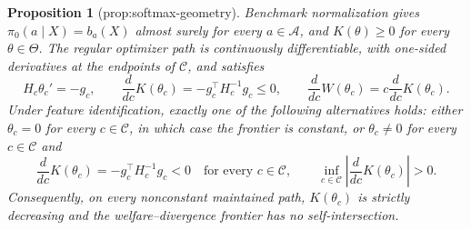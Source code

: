 \documentclass{article}
\newtheorem{proposition}{Proposition}
\begin{document}
\begin{proposition}[prop:softmax-geometry]\label{prop:softmax-geometry}
Benchmark normalization gives \(\pi_0(a\mid X)=b_a(X)\) almost surely for every \(a\in\mathcal A\), and \(K(\theta)\geq 0\) for every \(\theta\in\Theta\). The regular optimizer path is continuously differentiable, with one-sided derivatives at the endpoints of \(\mathcal C\), and satisfies
\[
 H_c\theta_c'=-g_c,\qquad
 \frac{d}{dc}K(\theta_c)=-g_c^\top H_c^{-1}g_c\leq 0,
 \qquad
 \frac{d}{dc}W(\theta_c)=c\frac{d}{dc}K(\theta_c).
\]
Under feature identification, exactly one of the following alternatives holds: either \(\theta_c=0\) for every \(c\in\mathcal C\), in which case the frontier is constant, or \(\theta_c\neq 0\) for every \(c\in\mathcal C\) and
\[
 \frac{d}{dc}K(\theta_c)=-g_c^\top H_c^{-1}g_c<0
 \quad\text{for every }c\in\mathcal C,
 \qquad
 \inf_{c\in\mathcal C}\left|\frac{d}{dc}K(\theta_c)\right|>0.
\]
Consequently, on every nonconstant maintained path, \(K(\theta_c)\) is strictly decreasing and the welfare--divergence frontier has no self-intersection.
\end{proposition}
\end{document}
